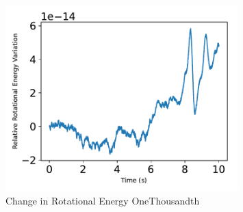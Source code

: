 \begin{figure}[htbp]\centerline{\includegraphics[width=0.8\textwidth]{AutoTeX/ChangeInRotationalEnergyOneThousandth}}\caption{Change in Rotational Energy OneThousandth}\label{fig:ChangeInRotationalEnergyOneThousandth}\end{figure}